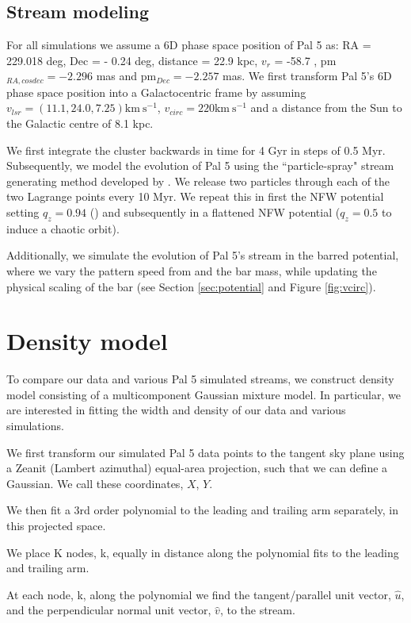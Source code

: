 \documentclass[modern]{aastex62}
\newcommand{\kms}{\ensuremath{\textrm{km}~\textrm{s}^{-1}}}
\begin{document}
\subsection{Stream modeling}
\label{sec:modeling}
For all simulations we assume a 6D phase space position of Pal 5 as: RA = 229.018 deg, Dec = - 0.24 deg, distance = 22.9 kpc, $v_r$ = -58.7 , pm$_{RA,cosdec}= -2.296$ mas and pm$_{Dec} = -2.257$ mas. We first transform Pal 5's 6D phase space position into a Galactocentric frame by assuming $v_{lsr} = (11.1, 24.0, 7.25) \kms$, 
$v_{circ} = 220  \kms$ and a distance from the Sun to the Galactic centre of 8.1 kpc. 

We first integrate the cluster backwards in time for 4 Gyr in steps of 0.5 Myr. Subsequently, we model the evolution of Pal 5 using the ``particle-spray" stream generating method developed by \citet{Fardal:2015}. We release two particles through each of the two Lagrange points every 10 Myr. We repeat this in first the NFW potential setting $q_z = 0.94$ (\citealt{Bovy:2016}) and subsequently in a flattened NFW potential ($q_z = 0.5$ to induce a chaotic orbit). 

Additionally, we simulate the evolution of Pal 5's stream in the barred potential, where we vary the pattern speed from and the bar mass, while updating the physical scaling of the bar (see Section \ref{sec:potential} and Figure \ref{fig:vcirc}). 


\section{Density model}
\label{sec:density}
To compare our data and various Pal 5 simulated streams, we construct density model consisting of a multicomponent Gaussian mixture model. In particular, we are interested in fitting the width and density of our data and various simulations.  

We first transform our simulated Pal 5 data points to the tangent sky plane using a Zeanit (Lambert azimuthal) equal-area projection, such that we can define a Gaussian. We call these coordinates, $X$, $Y$.

We then fit a 3rd order polynomial to the leading and trailing arm separately, in this projected space. 

We place K nodes, k, equally in distance along the polynomial fits to the leading and trailing arm. 

At each node, k, along the polynomial we find the tangent/parallel unit vector,  $\hat{u}$, and the perpendicular normal unit vector, $\hat{v}$, to the stream. 
\end{document}
